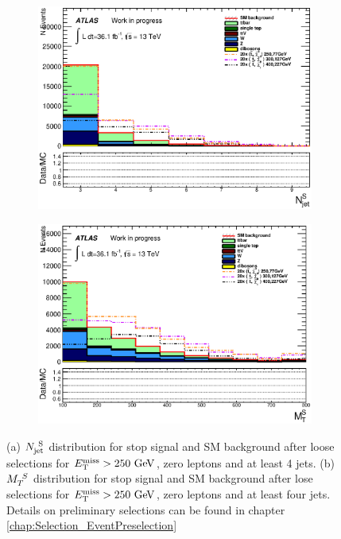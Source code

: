 \begin{figure}[h]
  \begin{center}
    \begin{subfigure}[a]{0.45\textwidth}
        \includegraphics[width=\textwidth]{figures/plotSR/SR_ND1_NjV_0SR.eps}%
        \caption{ }
    \end{subfigure}
    \begin{subfigure}[b]{0.45\textwidth}
        \includegraphics[width=\textwidth]{figures/plotSR/SR_ND1_MS_0SR.eps}%
                \caption{ }
    \end{subfigure}
\caption[$\NjV$ and $\MS$ distributions for stop signal and SM background after lose selections for $\met>250 \gev$, zero leptons and at least four jets]{ (a) $\NjV$ distribution for stop signal and SM background after loose selections for $\met>250 \gev$, zero leptons and at least 4 jets.  (b) $\MS$ distribution for stop signal and SM background after lose selections for $\met>250 \gev$, zero leptons and at least four jets. Details on preliminary selections can be found in chapter \ref{chap:Selection_EventPreselection} }
\end{center}
\label{fig:gluino_meff} 
\end{figure}

